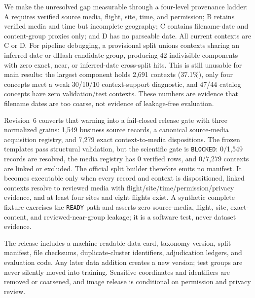 We make the unresolved gap measurable through a four-level provenance ladder: A requires verified source media, flight, site, time, and permission; B retains verified media and time but incomplete geography; C contains filename-date and content-group proxies only; and D has no parseable date. All current contexts are C or D. For pipeline debugging, a provisional split unions contexts sharing an inferred date or dHash candidate group, producing 42 indivisible components with zero exact, near, or inferred-date cross-split hits. This is still unusable for main results: the largest component holds 2,691 contexts (37.1\%), only four concepts meet a weak 30/10/10 context-support diagnostic, and 47/44 catalog concepts have zero validation/test contexts. These numbers are evidence that filename dates are too coarse, not evidence of leakage-free evaluation.

Revision~6 converts that warning into a fail-closed release gate with three normalized grains: 1,549 business source records, a canonical source-media acquisition registry, and 7,279 exact context-to-media dispositions. The frozen templates pass structural validation, but the scientific gate is \texttt{BLOCKED}: 0/1,549 records are resolved, the media registry has 0 verified rows, and 0/7,279 contexts are linked or excluded. The official split builder therefore emits no manifest. It becomes executable only when every record and context is dispositioned, linked contexts resolve to reviewed media with flight/site/time/permission/privacy evidence, and at least four sites and eight flights exist. A synthetic complete fixture exercises the \texttt{READY} path and asserts zero source-media, flight, site, exact-content, and reviewed-near-group leakage; it is a software test, never dataset evidence.

The release includes a machine-readable data card, taxonomy version, split manifest, file checksums, duplicate-cluster identifiers, adjudication ledgers, and evaluation code. Any later data addition creates a new version; test groups are never silently moved into training. Sensitive coordinates and identifiers are removed or coarsened, and image release is conditional on permission and privacy review.
